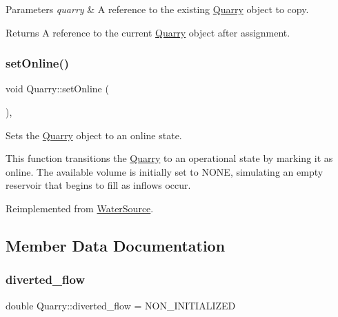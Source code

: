 \begin{DoxyParams}{Parameters}
{\em quarry} & A reference to the existing \mbox{\hyperlink{classQuarry}{Quarry}} object to copy.\\
\hline
\end{DoxyParams}
\begin{DoxyReturn}{Returns}
A reference to the current \mbox{\hyperlink{classQuarry}{Quarry}} object after assignment. 
\end{DoxyReturn}
\mbox{\label{classQuarry_af5fe04fa188d399485b2b4e64381e169}} 
\subsubsection{\texorpdfstring{set\+Online()}{setOnline()}}
{\footnotesize\ttfamily void Quarry\+::set\+Online (\begin{DoxyParamCaption}{ }\end{DoxyParamCaption})\hspace{0.3cm}{\ttfamily [override]}, {\ttfamily [virtual]}}



Sets the \mbox{\hyperlink{classQuarry}{Quarry}} object to an online state. 

This function transitions the \mbox{\hyperlink{classQuarry}{Quarry}} to an operational state by marking it as online. The available volume is initially set to {\ttfamily N\+O\+NE}, simulating an empty reservoir that begins to fill as inflows occur. 

Reimplemented from \mbox{\hyperlink{classWaterSource_aaa55dc6e14ff184380300147b53c56ec}{Water\+Source}}.



\subsection{Member Data Documentation}
\mbox{\label{classQuarry_ac2fe4ae274f23b1cc932655c5fb6263d}} 
\subsubsection{\texorpdfstring{diverted\+\_\+flow}{diverted\_flow}}
{\footnotesize\ttfamily double Quarry\+::diverted\+\_\+flow = N\+O\+N\+\_\+\+I\+N\+I\+T\+I\+A\+L\+I\+Z\+ED\hspace{0.3cm}{\ttfamily [private]}}



